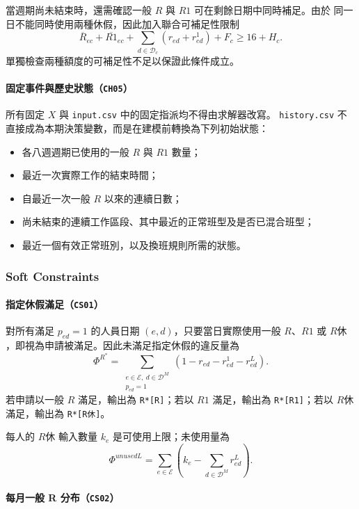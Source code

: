 \documentclass[12pt]{article}
\begin{document}
當週期尚未結束時，還需確認一般 \(R\) 與 \(R1\) 可在剩餘日期中同時補足。由於
同一日不能同時使用兩種休假，因此加入聯合可補足性限制
\[
  \overline{R}_{ec}+\overline{R1}_{ec}
  +\sum_{d\in\mathcal{D}_c}(r_{ed}+r^{1}_{ed})+F_c
  \geq 16+H_c.
\]
單獨檢查兩種額度的可補足性不足以保證此條件成立。

\paragraph{固定事件與歷史狀態（\texttt{CH05}）}

所有固定 \(X\) 與 \texttt{input.csv} 中的固定指派均不得由求解器改寫。
\texttt{history.csv} 不直接成為本期決策變數，而是在建模前轉換為下列初始狀態：

\begin{itemize}
  \item 各八週週期已使用的一般 \(R\) 與 \(R1\) 數量；
  \item 最近一次實際工作的結束時間；
  \item 自最近一次一般 \(R\) 以來的連續日數；
  \item 尚未結束的連續工作區段、其中最近的正常班型及是否已混合班型；
  \item 最近一個有效正常班別，以及換班規則所需的狀態。
\end{itemize}

\subsubsection{Soft Constraints}

\paragraph{指定休假滿足（\texttt{CS01}）}

對所有滿足 \(p_{ed}=1\) 的人員日期 \((e,d)\)，只要當日實際使用一般
\(R\)、\(R1\) 或 \(R休\)，即視為申請被滿足。因此未滿足指定休假的違反量為
\[
  \Phi^{R^*}
  =
  \sum_{\substack{e\in\mathcal{E},\ d\in\mathcal{D}^{M}\\p_{ed}=1}}
  (1-r_{ed}-r^{1}_{ed}-r^{L}_{ed}).
\]
若申請以一般 \(R\) 滿足，輸出為 \texttt{R*[R]}；若以 \(R1\) 滿足，輸出為
\texttt{R*[R1]}；若以 \(R休\) 滿足，輸出為 \texttt{R*[R休]}。

每人的 \(R休\) 輸入數量 \(k_e\) 是可使用上限；未使用量為
\[
  \Phi^{unusedL}
  =\sum_{e\in\mathcal E}\left(k_e-\sum_{d\in\mathcal D^M}r^L_{ed}\right).
\]

\paragraph{每月一般 R 分布（\texttt{CS02}）}
\end{document}

